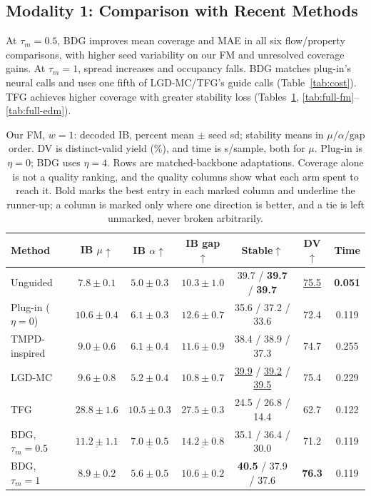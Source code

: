 \documentclass{article}
\begin{document}
\subsection{Modality 1: Comparison with Recent Methods}\label{sec:recent}
At $\tau_m=0.5$, BDG improves mean coverage and MAE in all six flow/property comparisons, with higher seed variability on our FM and unresolved coverage gains. At $\tau_m=1$, spread increases and occupancy falls. BDG matches plug-in's neural calls and uses one fifth of LGD-MC/TFG's guide calls (Table~\ref{tab:cost}). TFG achieves higher coverage with greater stability loss (Tables~\ref{tab:recent}, \ref{tab:full-fm}--\ref{tab:full-edm}).
\begin{table}[!htbp]
\centering\small
\caption{Our FM, $w=1$: decoded IB, percent mean $\pm$ seed sd; stability means in $\mu/\alpha/\mathrm{gap}$ order. DV is distinct-valid yield (\%), and time is s/sample, both for $\mu$. Plug-in is $\eta=0$; BDG uses $\eta=4$. Rows are matched-backbone adaptations. Coverage alone is not a quality ranking, and the quality columns show what each arm spent to reach it. Bold marks the best entry in each marked column and underline the runner-up; a column is marked only where one direction is better, and a tie is left unmarked, never broken arbitrarily.}
\label{tab:recent}
\begin{tabular}{lcccccc}
\toprule
Method & IB $\mu\uparrow$ & IB $\alpha\uparrow$ & IB gap$\uparrow$ & Stable$\uparrow$ & DV$\uparrow$ & Time\\
\midrule
Unguided & $7.8\pm0.1$ & $5.0\pm0.3$ & $10.3\pm1.0$ & 39.7 / \textbf{39.7} / \textbf{39.7}& \underline{75.5}& \textbf{0.051}\\
Plug-in ($\eta=0$) & $10.6\pm0.4$ & $6.1\pm0.3$ & $12.6\pm0.7$ & 35.6 / 37.2 / 33.6& 72.4 & 0.119\\
TMPD-inspired & $9.0\pm0.6$ & $6.1\pm0.4$ & $11.6\pm0.9$ & 38.4 / 38.9 / 37.3& 74.7 & 0.255\\
LGD-MC & $9.6\pm0.8$ & $5.2\pm0.4$ & $10.8\pm0.7$ & \underline{39.9} / \underline{39.2} / \underline{39.5}& 75.4 & 0.229\\
TFG & $\mathbf{28.8\pm1.6}$& $\mathbf{10.5\pm0.3}$& $\mathbf{27.5\pm0.3}$& 24.5 / 26.8 / 14.4& 62.7 & 0.122\\
BDG, $\tau_m=0.5$ & $\underline{11.2\pm1.1}$& $\underline{7.0\pm0.5}$& $\underline{14.2\pm0.8}$& 35.1 / 36.4 / 30.0& 71.2 & 0.119\\
BDG, $\tau_m=1$ & $8.9\pm0.2$ & $5.6\pm0.5$ & $10.6\pm0.2$ & \textbf{40.5} / 37.9 / 37.6& \textbf{76.3}& 0.119\\
\bottomrule
\end{tabular}
\end{table}
\end{document}
